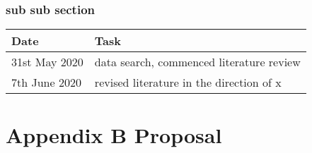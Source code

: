\documentclass[
  12pt,
  oneside]{book}
\begin{document}
\hypertarget{sub-sub-section}{%
\subsection*{sub sub section}\label{sub-sub-section}}

\begin{table}[H]
\centering
\begin{tabular}{ll}
\toprule
\textbf{Date} & \textbf{Task}\\
\midrule
31st May 2020 & data search, commenced literature review\\
7th June 2020 & revised literature in the direction of x\\
\bottomrule
\end{tabular}
\end{table}

\hypertarget{appendix-b-proposal}{%
\chapter*{Appendix B Proposal}\label{appendix-b-proposal}}

\enddocument

\printbibliography
\end{document}
